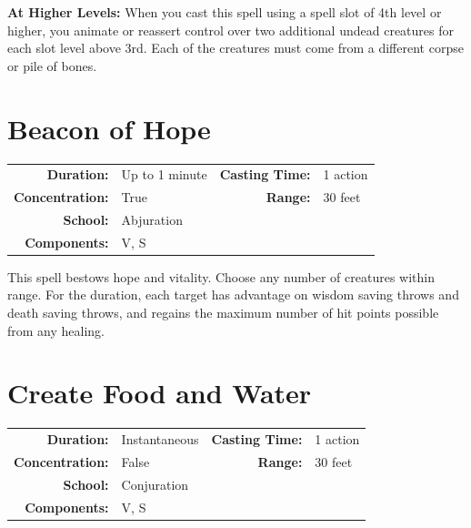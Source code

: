 \documentclass[12pt,showtrims]{memoir}
\begin{document}
\vspace{8pt} \noindent\textbf{At Higher Levels:} When you cast this spell using a spell slot of 4th level or higher, you animate or reassert control over two additional undead creatures for each slot level above 3rd. Each of the creatures must come from a different corpse or pile of bones.
\newpage
\section*{Beacon of Hope}

{
\small\centering\vspace{-6pt}
\begin{tabular}{rlrl}
\toprule

\textbf{Duration:} & Up to 1 minute &
\textbf{Casting Time:} & 1 action \\
\textbf{Concentration:} & True &
\textbf{Range:} & 30 feet \\
\textbf{School:} & Abjuration \\
\textbf{Components:} & \multicolumn{3}{p{0.7\textwidth}}{V, S}\\

\bottomrule
\end{tabular}
}

\vspace{1\baselineskip}\noindent This spell bestows hope and vitality. Choose any number of creatures within range. For the duration, each target has advantage on wisdom saving throws and death saving throws, and regains the maximum number of hit points possible from any healing.

\newpage
\section*{Create Food and Water}

{
\small\centering\vspace{-6pt}
\begin{tabular}{rlrl}
\toprule

\textbf{Duration:} & Instantaneous &
\textbf{Casting Time:} & 1 action \\
\textbf{Concentration:} & False &
\textbf{Range:} & 30 feet \\
\textbf{School:} & Conjuration \\
\textbf{Components:} & \multicolumn{3}{p{0.7\textwidth}}{V, S}\\

\bottomrule
\end{tabular}
}
\end{document}
